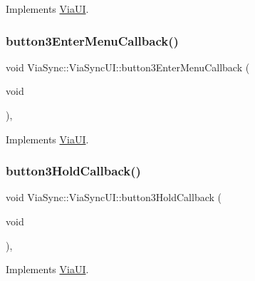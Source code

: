 Implements \mbox{\hyperlink{class_via_u_i_a8fce17e375ea6fe3a4746bff3e6dec75}{Via\+UI}}.

\mbox{\label{class_via_sync_1_1_via_sync_u_i_a695a9d89eaf1b1e03bba057e4f89b3c2}} 
\subsubsection{\texorpdfstring{button3\+Enter\+Menu\+Callback()}{button3EnterMenuCallback()}}
{\footnotesize\ttfamily void Via\+Sync\+::\+Via\+Sync\+U\+I\+::button3\+Enter\+Menu\+Callback (\begin{DoxyParamCaption}\item[{void}]{ }\end{DoxyParamCaption})\hspace{0.3cm}{\ttfamily [override]}, {\ttfamily [virtual]}}



Implements \mbox{\hyperlink{class_via_u_i_a883081e46324dec82ad89f2e77cf4b65}{Via\+UI}}.

\mbox{\label{class_via_sync_1_1_via_sync_u_i_af7088ee62cddc1187af86e970efe643a}} 
\subsubsection{\texorpdfstring{button3\+Hold\+Callback()}{button3HoldCallback()}}
{\footnotesize\ttfamily void Via\+Sync\+::\+Via\+Sync\+U\+I\+::button3\+Hold\+Callback (\begin{DoxyParamCaption}\item[{void}]{ }\end{DoxyParamCaption})\hspace{0.3cm}{\ttfamily [override]}, {\ttfamily [virtual]}}



Implements \mbox{\hyperlink{class_via_u_i_a7334aea36cf78afac284dd5e899e8ace}{Via\+UI}}.

